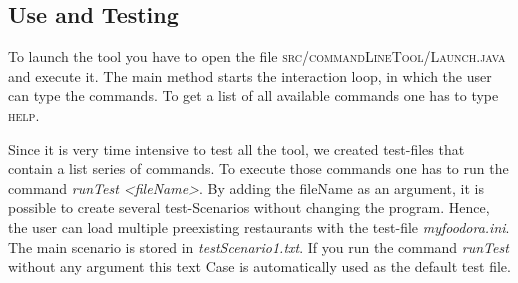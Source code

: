 \subsection{Use and Testing}
\label{sub:use_and_testing}

To launch the tool you have to open the file \textsc{src/commandLineTool/Launch.java} and execute
it. The main method starts the interaction loop, in which the user can type the commands. To get
a list of all available commands one has to type \textsc{help}. 

Since it is very time intensive to test all the tool, we created test-files that
contain a list series of commands. To execute those commands one has to run the command 
\textit{runTest <fileName>}. By adding the fileName as an argument, it is possible to create 
several test-Scenarios without changing the program. Hence, the user can load multiple 
preexisting restaurants with the test-file \textit{my\textunderscore foodora.ini}.
The main scenario is stored in \textit{testScenario1.txt}. If you run the command
\textit{runTest} without any argument this text Case is automatically used as the default test
file.


